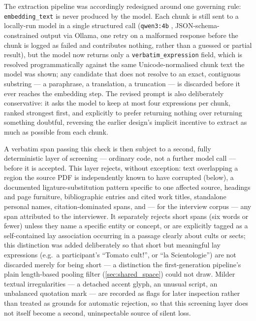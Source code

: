 The extraction pipeline was accordingly redesigned around one governing rule: \texttt{embedding\_text} is never produced by the model. Each chunk is still sent to a locally-run model in a single structured call (\texttt{qwen3:4b} \autocite{yangQwen3TechnicalReport2025}, JSON-schema-constrained output via Ollama, one retry on a malformed response before the chunk is logged as failed and contributes nothing, rather than a guessed or partial result), but the model now returns only a \texttt{verbatim\_expression} field, which is resolved programmatically against the same Unicode-normalised chunk text the model was shown; any candidate that does not resolve to an exact, contiguous substring — a paraphrase, a translation, a truncation — is discarded before it ever reaches the embedding step. The revised prompt is also deliberately conservative: it asks the model to keep at most four expressions per chunk, ranked strongest first, and explicitly to prefer returning nothing over returning something doubtful, reversing the earlier design's implicit incentive to extract as much as possible from each chunk.

A verbatim span passing this check is then subject to a second, fully deterministic layer of screening — ordinary code, not a further model call — before it is accepted. This layer rejects, without exception: text overlapping a region the source PDF is independently known to have corrupted (below), a documented ligature-substitution pattern specific to one affected source, headings and page furniture, bibliographic entries and cited work titles, standalone personal names, citation-dominated spans, and — for the interview corpus — any span attributed to the interviewer. It separately rejects short spans (six words or fewer) unless they name a specific entity or concept, or are explicitly tagged as a self-contained lay association occurring in a passage clearly about cults or sects; this distinction was added deliberately so that short but meaningful lay expressions (e.g.\ a participant's \enquote{Tomato cult!}, or \enquote{la Scientologie}) are not discarded merely for being short — a distinction the first-generation pipeline's plain length-based pooling filter (\ref{sec:shared_space}) could not draw. Milder textual irregularities — a detached accent glyph, an unusual script, an unbalanced quotation mark — are recorded as flags for later inspection rather than treated as grounds for automatic rejection, so that this screening layer does not itself become a second, uninspectable source of silent loss.

